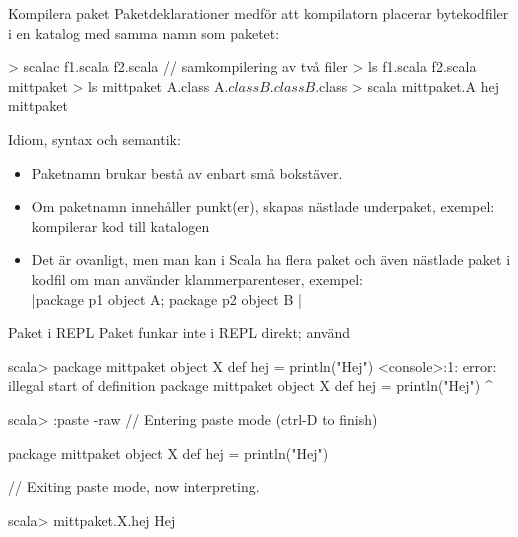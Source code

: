 \begin{Slide}{Kompilera paket}\SlideFontSmall
Paketdeklarationer medför att kompilatorn placerar bytekodfiler i en katalog med samma namn som paketet:
\begin{REPL}
> scalac f1.scala f2.scala     // samkompilering av två filer
> ls
f1.scala  f2.scala  mittpaket
> ls mittpaket
A.class  A$.class  B.class  B$.class
> scala mittpaket.A
hej mittpaket
\end{REPL}
\pause
Idiom, syntax och semantik:
\begin{itemize}
  \item Paketnamn brukar bestå av enbart små bokstäver.
  \item Om paketnamn innehåller punkt(er), skapas nästlade underpaket, exempel:   kompilerar kod till katalogen 
  \item Det är ovanligt, men man kan i Scala ha flera paket och även nästlade paket i  kodfil
  om man använder klammerparenteser, exempel:\\
  \code|package p1 { object A; package p2 { object B }}|
\end{itemize}
\end{Slide}

\begin{Slide}{Paket i REPL}
Paket funkar inte i REPL direkt; använd 

\begin{REPLnonum}
scala> package mittpaket { object X { def hej = println("Hej") } }
<console>:1: error: illegal start of definition
       package mittpaket { object X { def hej = println("Hej") } }
       ^

scala> :paste -raw
// Entering paste mode (ctrl-D to finish)

package mittpaket { object X { def hej = println("Hej") } }

// Exiting paste mode, now interpreting.


scala> mittpaket.X.hej
Hej

\end{REPLnonum}

\end{Slide}




